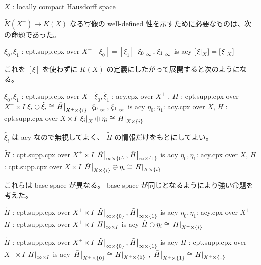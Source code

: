 \documentclass[dvipdfmx]{jsarticle}
\begin{document}
\begin{When}
\itemwhen
  \Fix \(X\) : locally compact Hausdorff space
\end{When}

\(\tilde{K}(X^+) \to K(X)\) なる写像の well-defined 性を示すために必要なものは、次の命題であった。
\begin{Theorem}[示したい命題]
\itemenum \(\xi_0, \xi_1\) : cpt.supp.cpx over \(X^+\)
\itemwith \([\xi_0] = [\xi_1]\)
\itemwith \(\left. {\xi_0} \right| _{\infty} , \left. {\xi_1} \right| _{\infty}\) is acy
\itemthen \THENLINE
\itemwith \([\left. {\xi} \right| _{X}] = [\left. {\xi} \right| _{X}]\)
\end{Theorem}

これを \([\xi]\) を使わずに \(K(X)\) の定義にしたがって展開すると次のようになる。
\begin{Theorem}[定義を展開した命題]
\itemenum \(\xi_0, \xi_1\) : cpt.supp.cpx over \(X^+\)
\itemenum \(\tilde{\xi_0}, \tilde{\xi_1}\) : acy.cpx over \(X^+\) , \(\tilde{H}\) : cpt.supp.cpx over \(X^+ \times I\)
\itemwith \(\xi_i \oplus \tilde{\xi_i} \cong \left. {\tilde{H}} \right| _{X^+ \times \{i\}}\)
\itemwith \(\left. {\xi_0} \right| _{\infty} , \left. {\xi_1} \right| _{\infty}\) is acy
\itemthen \THENLINE
\itemenum \(\eta_0, \eta_1\): acy.cpx over \(X\), \(H\) : cpt.supp.cpx over \(X \times I\)
\itemwith \(\left. {\xi_i} \right| _{X} \oplus \eta_i \cong \left. {H} \right| _{X \times \{i\}}\)
\end{Theorem}

\(\tilde{\xi_i}\) は acy なので無視してよく、 \(\tilde{H}\) の情報だけをもとにしてよい。
\begin{Theorem}[より整理した形の必要十分な命題]
\itemenum \(\tilde{H}\) : cpt.supp.cpx over \(X^+ \times I\)
\itemwith \(\left. {\tilde{H}} \right| _{\infty \times \{0\}} , \left. {\tilde{H}} \right| _{\infty \times \{1\}}\) is acy
\itemthen \THENLINE
\itemenum \(\eta_0, \eta_1\): acy.cpx over \(X\), \(H\) : cpt.supp.cpx over \(X \times I\)
\itemwith \(\left. {\tilde{H}} \right| _{X \times \{i\}} \oplus \eta_i \cong \left. {H} \right| _{X \times \{i\}}\)
\end{Theorem}

これらは base space が異なる。
base space が同じとなるようにより強い命題を考えた。
\begin{Theorem}[おそらく成り立つと思われる十分命題]
\itemenum \(\tilde{H}\) : cpt.supp.cpx over \(X^+ \times I\)
\itemwith \(\left. {\tilde{H}} \right| _{\infty \times \{0\}} , \left. {\tilde{H}} \right| _{\infty \times \{1\}}\) is acy
\itemthen \THENLINE
\itemenum \(\eta_0, \eta_1\): acy.cpx over \(X^+\)
\itemenum \(H\) : cpt.supp.cpx over \(X^+ \times I\)
\itemwith \(\left. {H} \right| _{\infty \times I}\) is acy
\itemwith \(\tilde{H} \oplus \eta_i \cong \left. {H} \right| _{X^+ \times \{i\}}\)
\end{Theorem}

\begin{Theorem}
\itemenum \(\tilde{H}\) : cpt.supp.cpx over \(X^+ \times I\)
\itemwith \(\left. {\tilde{H}} \right| _{\infty \times \{0\}} , \left. {\tilde{H}} \right| _{\infty \times \{1\}}\) is acy
\itemthen \THENLINE
\itemenum \(H\) : cpt.supp.cpx over \(X^+ \times I\)
\itemwith \(\left. {H} \right| _{\infty \times I}\) is acy
\itemwith \(\left. {\tilde{H}} \right| _{X^+ \times \{0\}} \cong \left. {H} \right| _{X^+ \times \{0\}}\) , \(\left. {\tilde{H}} \right| _{X^+ \times \{1\}} \cong \left. {H} \right| _{X^+ \times \{1\}}\)
\end{Theorem}
\end{document}
